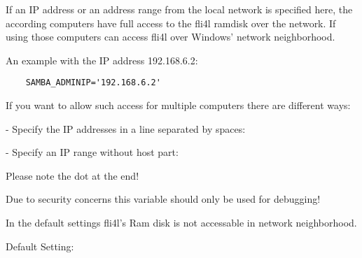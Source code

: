 \begin{description}

    If an IP address or an address range from the local network
    is specified here, the according computers have full access to
    the fli4l ramdisk over the network.
    If using  those computers can access
    fli4l over Windows' network neighborhood.

    An example with the IP address 192.168.6.2:

\begin{example}
\begin{verbatim}
    SAMBA_ADMINIP='192.168.6.2'
\end{verbatim}
\end{example}

    If you want to allow such access for multiple computers there are
    different ways:

    - Specify the IP addresses in a line separated by spaces:


    - Specify an IP range without host part:


    Please note the dot at the end!

    Due to security concerns this variable should only be used for debugging!

    In the default settings fli4l's Ram disk is not accessable in
    network neighborhood.

    Default Setting: 
\end{description}

